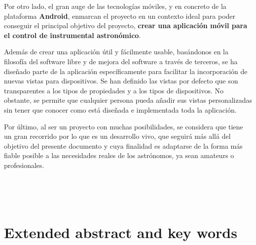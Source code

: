 {\bigskip
Por otro lado, el gran auge de las tecnologías móviles, y en concreto de la plataforma \textbf{Android}, enmarcan el proyecto en un contexto ideal para poder conseguir el principal objetivo del proyecto, \textbf{crear una aplicación móvil para el control de instrumental astronómico}.

\bigskip
Además de crear una aplicación útil y fácilmente usable, basándonos en la filosofía del software libre y de mejora del software a través de terceros, se ha diseñado parte de la aplicación específicamente para facilitar la incorporación de nuevas vistas para dispositivos. Se han definido las vistas por defecto que son transparentes a los tipos de propiedades y a los tipos de dispositivos. No obstante, se permite que cualquier persona pueda añadir sus vistas personalizadas sin tener que conocer como está diseñada e implementada toda la aplicación.

\bigskip
Por último, al ser un proyecto con muchas posibilidades, se considera que tiene un gran recorrido por lo que es un desarrollo vivo, que seguirá más allá del objetivo del presente documento y cuya finalidad es adaptarse de la forma más fiable posible a las necesidades reales de los astrónomos, ya sean amateurs o profesionales.

\newpage
\begin{center}
{\LARGE\bfseries\tituloEng}\\
\end{center}
\begin{center}
\autor\
\end{center}

\section{Extended abstract and key words}

}
